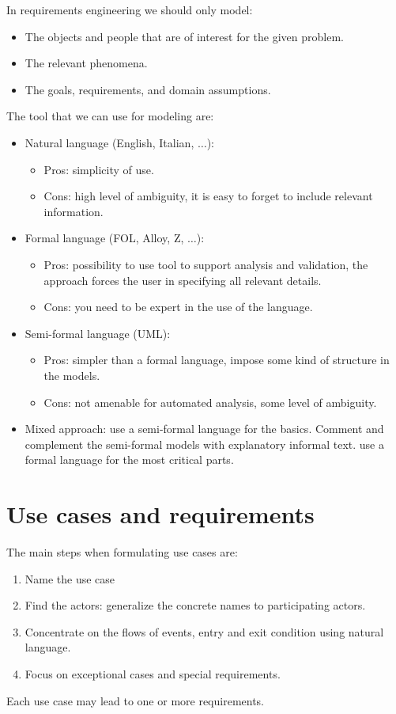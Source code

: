 \documentclass[12pt, a4paper]{report}
\newtheorem[style=M,bodystyle=\normalfont]{theorem}{Theorem}
\newtheorem[style=M,bodystyle=\normalfont]{corollary}{Corollary}
\newtheorem[style=M,bodystyle=\normalfont]{lemma}{Lemma}
\newtheorem[style=M,bodystyle=\normalfont]{definition}{Definition}
\begin{document}
    In requirements engineering we should only model:
    \begin{itemize}
        \item The objects and people that are of interest for the given problem.
        \item The relevant phenomena.
        \item The goals, requirements, and domain assumptions.
    \end{itemize}
    The tool that we can use for modeling are: 
    \begin{itemize}
        \item Natural language (English, Italian, $\dots$):
        \begin{itemize}
            \item Pros: simplicity of use.
            \item Cons: high level of ambiguity, it is easy to forget to include relevant information.
        \end{itemize}
        \item Formal language (FOL, Alloy, Z, $\dots$):
        \begin{itemize}
            \item Pros: possibility to use tool to support analysis and validation, the approach forces the user in specifying all relevant details.
            \item Cons: you need to be expert in the use of the language.
        \end{itemize}
        \item Semi-formal language (UML):
        \begin{itemize}
            \item Pros: simpler than a formal language, impose some kind of structure in the models.
            \item Cons: not amenable for automated analysis, some level of ambiguity.
        \end{itemize}
        \item Mixed approach: use a semi-formal language for the basics. Comment and complement the semi-formal models with explanatory informal text. use a formal language for the 
        most critical parts.
    \end{itemize}

    \section{Use cases and requirements}
    The main steps when formulating use cases are: 
    \begin{enumerate}
        \item Name the use case
        \item Find the actors: generalize the concrete names to participating actors.
        \item Concentrate on the flows of events, entry and exit condition using natural language.
        \item Focus on exceptional cases and special requirements.
    \end{enumerate}
    Each use case may lead to one or more requirements.
     
\end{document}
